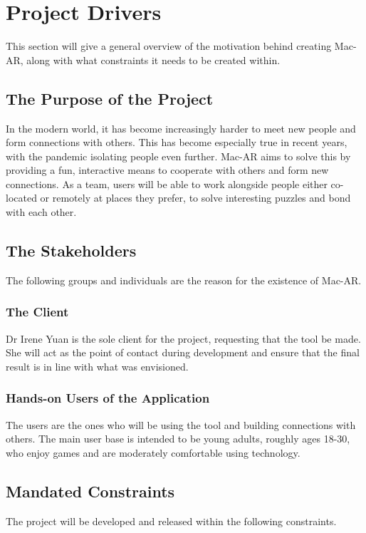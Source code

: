 \documentclass[12pt]{article}
\begin{document}
\section{Project Drivers}

This section will give a general overview of the motivation behind creating Mac-AR, along with what constraints it needs to be created within. 

\subsection{The Purpose of the Project}
In the modern world, it has become increasingly harder to meet new people and form connections with others. This has become especially true in recent years, with the pandemic isolating people even further. Mac-AR aims to solve this by providing a fun, interactive means to cooperate with others and form new connections. As a team, users will be able to work alongside people either co-located or remotely at places they prefer, to solve interesting puzzles and bond with each other.

\subsection{The Stakeholders}
The following groups and individuals are the reason for the existence of Mac-AR. 

\subsubsection{The Client}
Dr Irene Yuan is the sole client for the project, requesting that the tool be made. She will act as the point of contact during development and ensure that the final result is in line with what was envisioned. 

\subsubsection{Hands-on Users of the Application}
The users are the ones who will be using the tool and building connections with others. The main user base is intended to be young adults, roughly ages 18-30, who enjoy games and are moderately comfortable using technology.

\subsection{Mandated Constraints}
The project will be developed and released within the following constraints. 
\end{document}
